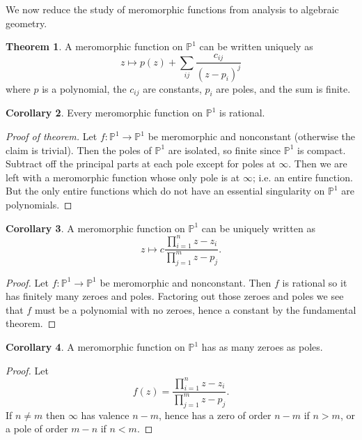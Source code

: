 \documentclass[12pt]{report}
\newcommand{\PP}{\mathbb{P}}
\theoremstyle{definition}
\newtheorem{theorem}{Theorem}[chapter]
\newtheorem{corollary}[theorem]{Corollary}
\begin{document}
We now reduce the study of meromorphic functions from analysis to algebraic geometry.
\begin{theorem}
A meromorphic function on $\PP^1$ can be written uniquely as
$$z \mapsto p(z) + \sum_{ij}\frac{c_{ij}}{(z - p_i)^j}$$
where $p$ is a polynomial, the $c_{ij}$ are constants, $p_i$ are poles, and the sum is finite.
\end{theorem}
\begin{corollary}
Every meromorphic function on $\PP^1$ is rational.
\end{corollary}
\begin{proof}[Proof of theorem]
Let $f: \PP^1 \to \PP^1$ be meromorphic and nonconstant (otherwise the claim is trivial).
Then the poles of $\PP^1$ are isolated, so finite since $\PP^1$ is compact.
Subtract off the principal parts at each pole except for poles at $\infty$.
Then we are left with a meromorphic function whose only pole is at $\infty$; i.e. an entire function.
But the only entire functions which do not have an essential singularity on $\PP^1$ are polynomials.
\end{proof}
\begin{corollary}
A meromorphic function on $\PP^1$ can be uniquely written as
$$z \mapsto c\frac{\prod_{i=1}^n z - z_i}{\prod_{j=1}^m z - p_j}.$$
\end{corollary}
\begin{proof}
Let $f: \PP^1 \to \PP^1$ be meromorphic and nonconstant.
Then $f$ is rational so it has finitely many zeroes and poles. Factoring out those zeroes and poles we see that $f$ must be a polynomial with no zeroes, hence a constant by the fundamental theorem.
\end{proof}
\begin{corollary}
A meromorphic function on $\PP^1$ has as many zeroes as poles.
\end{corollary}
\begin{proof}
Let
$$f(z) = \frac{\prod_{i=1}^n z - z_i}{\prod_{j=1}^m z - p_j}.$$
If $n \neq m$ then $\infty$ has valence $n - m$, hence has a zero of order $n - m$ if $n > m$, or a pole of order $m - n$ if $n < m$.
\end{proof}
\end{document}
